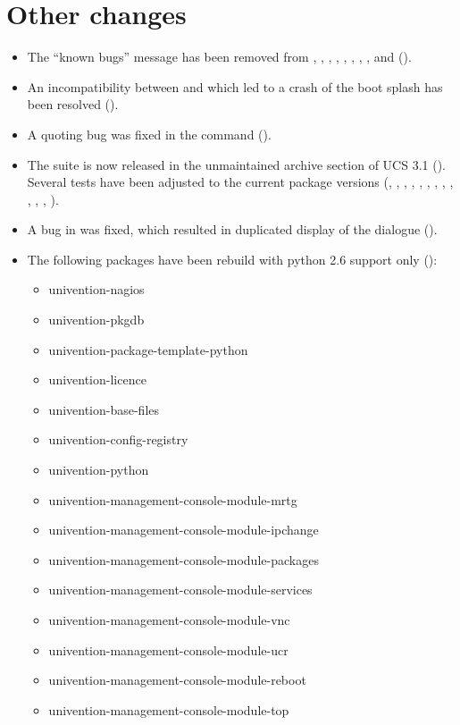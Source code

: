 \section{Other changes}
\begin{itemize}
\item The ``known bugs'' message has been removed from
  ,
  ,
  ,
  , ,
  ,
  ,
  , and
   ().

\item An incompatibility between  and
 which led to a crash of the boot splash has been
resolved ().

\item A quoting bug was fixed in the  command
  ().

\item The  suite is now released in the unmaintained archive
  section of UCS 3.1 (). Several tests have been adjusted to the current package versions
(, , , ,
, , , ,
, , , ,
).

\item A bug in  was fixed,
  which resulted in duplicated display of the  dialogue ().

\item The following packages have been rebuild with python 2.6 support
only ():
\begin{itemize}
\item univention-nagios
\item univention-pkgdb
\item univention-package-template-python
\item univention-licence
\item univention-base-files
\item univention-config-registry
\item univention-python
\item univention-management-console-module-mrtg
\item univention-management-console-module-ipchange
\item univention-management-console-module-packages
\item univention-management-console-module-services
\item univention-management-console-module-vnc
\item univention-management-console-module-ucr
\item univention-management-console-module-reboot
\item univention-management-console-module-top
\end{itemize}


\end{itemize}
